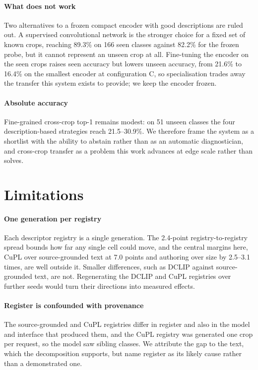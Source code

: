 \documentclass[a4paper,fleqn]{cas-dc}
\begin{document}
\paragraph{What does not work} Two alternatives to a frozen compact encoder with good descriptions
are ruled out. A supervised convolutional network is the stronger choice for a fixed set of known crops,
reaching 89.3\% on 166 seen classes against 82.2\% for the frozen probe, but it cannot represent an
unseen crop at all. Fine-tuning the encoder on the seen crops raises seen accuracy but lowers unseen
accuracy, from 21.6\% to 16.4\% on the smallest encoder at configuration C, so specialisation trades
away the transfer this system exists to provide; we keep the encoder frozen.

\paragraph{Absolute accuracy} Fine-grained cross-crop top-1 remains modest: on 51 unseen classes the four
description-based strategies reach 21.5--30.9\%. We therefore frame the system as a shortlist with the ability to abstain rather than as an
automatic diagnostician, and cross-crop transfer as a problem this work advances at edge scale rather
than solves.

\section{Limitations}
\label{sec:limits}

\paragraph{One generation per registry} Each descriptor registry is a single generation. The
2.4-point registry-to-registry spread bounds how far any single cell could move, and the central
margins here, CuPL over source-grounded text at 7.0 points and authoring over size by 2.5--3.1 times,
are well outside it. Smaller differences, such as DCLIP against source-grounded text, are not.
Regenerating the DCLIP and CuPL registries over further seeds would turn their directions into
measured effects.

\paragraph{Register is confounded with provenance} The source-grounded and CuPL registries differ in
register and also in the model and interface that produced them, and the CuPL registry was generated
one crop per request, so the model saw sibling classes. We attribute the gap to the text, which the
decomposition supports, but name register as its likely cause rather than a demonstrated one.
\end{document}
